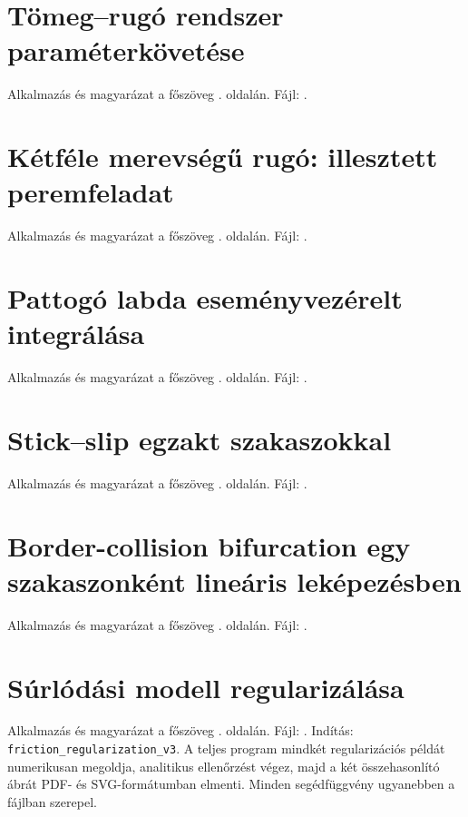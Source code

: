 \clearpage
\section{Tömeg--rugó rendszer paraméterkövetése}\label{ap:spring_cont}
Alkalmazás és magyarázat a főszöveg \pageref{use:spring_cont}. oldalán. 
Fájl: .


\clearpage
\section{Kétféle merevségű rugó: illesztett peremfeladat}\label{ap:bilinear}
Alkalmazás és magyarázat a főszöveg \pageref{use:bilinear}. oldalán. 
Fájl: .


\clearpage
\section{Pattogó labda eseményvezérelt integrálása}\label{ap:ball}
Alkalmazás és magyarázat a főszöveg \pageref{use:ball}. oldalán. 
Fájl: .


\clearpage
\section{Stick--slip egzakt szakaszokkal}\label{ap:stick}
Alkalmazás és magyarázat a főszöveg \pageref{use:stick}. oldalán. 
Fájl: .


\clearpage
\section{Border-collision bifurcation egy szakaszonként lineáris leképezésben}\label{ap:border}
Alkalmazás és magyarázat a főszöveg \pageref{use:border}. oldalán. 
Fájl: .


\clearpage
\section{Súrlódási modell regularizálása}\label{ap:regularization}
Alkalmazás és magyarázat a főszöveg \pageref{use:regularization}. oldalán. 
Fájl: . Indítás: \lstinline|friction_regularization_v3|. A teljes program mindkét regularizációs példát numerikusan megoldja, analitikus ellenőrzést végez, majd a két összehasonlító ábrát PDF- és SVG-formátumban elmenti. Minden segédfüggvény ugyanebben a fájlban szerepel.


